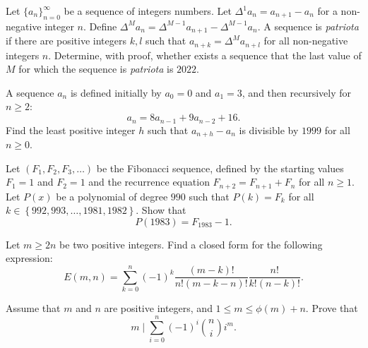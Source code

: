 \documentclass[12pt,a4paper]{memoir}
\theoremstyle{definition}
\begin{document}
\begin{question}[name={2022 Brazil}]
	Let $\{a_n\}_{n=0}^{\infty}$ be a sequence of integers numbers. Let $\Delta^1a_n=a_{n+1}-a_n$ for a non-negative integer $n$. Define $\Delta^Ma_n= \Delta^{M-1}a_{n+1}- \Delta^{M-1}a_n$. A sequence is \textit{patriota} if there are positive integers $k,l$ such that $a_{n+k}=\Delta^Ma_{n+l}$ for all non-negative integers $n$. Determine, with proof, whether exists a sequence that the last value of $M$ for which the sequence is \textit{patriota} is $2022$.
\end{question}


\begin{question}[name={1999 Brazil TST}]
	A sequence $a_n$ is defined initially by $a_0=0$ and $a_1=3$, and then recursively for $n\geq 2$: $$a_n=8a_{n-1}+9a_{n-2}+16.$$ Find the least positive integer $h$ such that $a_{n+h}-a_n$ is divisible by $1999$ for all $n\ge0$.
\end{question}


\begin{question}[name={1983 IMO Shortlist}]
	Let $ \left(F_1,F_2,F_3,\dots\right)$ be the Fibonacci sequence, defined by the starting values $ F_1 = 1$ and $ F_2 = 1$ and the recurrence equation $ F_{n + 2} = F_{n + 1} + F_n$ for all $ n\geq 1$. Let $ P\left(x\right)$ be a polynomial of degree $ 990$ such that $ P\left(k\right) = F_k$ for all $ k \in\left\{ 992, 993, \dots , 1981, 1982\right\}$. Show that \[P\left(1983\right) = F_{1983} - 1.\]
\end{question}



\begin{question}[name={2004 Fourth Mathlinks Contest}]
	Let $m \geq 2n$ be two positive integers. Find a closed form for the following expression:
	\[E(m,n)=\sum_{k=0}^{n}(-1)^k\frac{(m-k)!}{n!(m-k-n)!}\frac{n!}{k!(n-k)!}.\]
\end{question}





\begin{question}
	Assume that $m$ and $n$ are positive integers, and $1\leq m\leq \phi (m)+n$. Prove that \[m \mid \sum_{i=0}^{n} (-1)^i \binom{n}{i} i^m.\]
\end{question}
\end{document}

